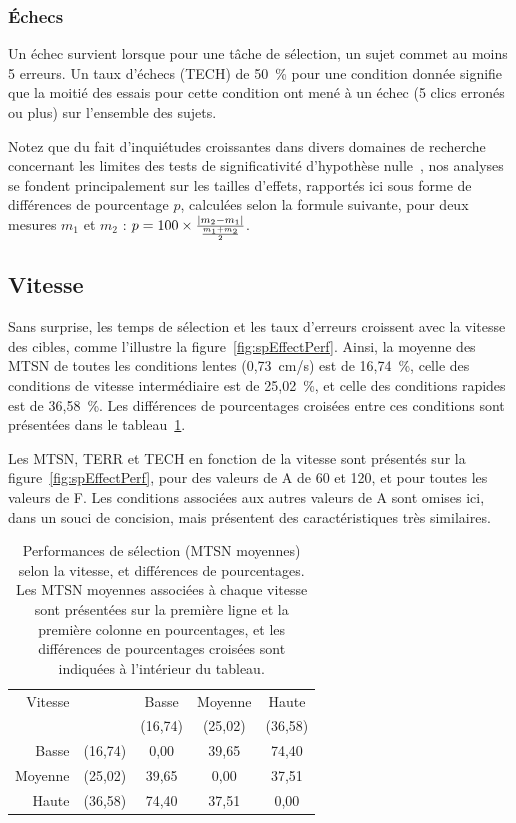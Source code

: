	\subsubsection{Échecs}
	Un échec survient lorsque pour une tâche de sélection, un sujet commet au moins 5 erreurs. 	Un taux d'échecs (TECH) de 50~\%{} pour une condition donnée signifie que la moitié des essais pour cette condition ont mené à un échec (5 clics erronés ou plus) sur l'ensemble des sujets.
	
	Notez que du fait d'inquiétudes croissantes dans divers domaines de recherche concernant les limites des tests de significativité d'hypothèse nulle~\cite{dragicevic2014running, cumming2014new}, nos analyses se fondent principalement sur les tailles d'effets, rapportés ici sous forme de différences de pourcentage $p$, calculées selon la formule suivante, pour deux mesures $m_{1}$ et $m_{2}$ : $p = 100 \times \frac{\abs*{m_{2} - m_{1}}}{\frac{m_{1} + m_{2}}{2}}$.

	\subsection{Vitesse}
	Sans surprise, les temps de sélection et les taux d'erreurs croissent avec la vitesse des cibles, comme l'illustre la figure~\ref{fig:spEffectPerf}. Ainsi, la moyenne des MTSN de toutes les conditions lentes (0,73~cm/s) est de 16,74~\%{}, celle des conditions de vitesse intermédiaire est de 25,02~\%{}, et celle des conditions rapides est de 36,58~\%{}. Les différences de pourcentages croisées entre ces conditions sont présentées dans le tableau~\ref{tab:spPerf}.

	Les MTSN, TERR et TECH en fonction de la vitesse sont présentés sur la figure~\ref{fig:spEffectPerf}, pour des valeurs de A de 60 et 120, et pour toutes les valeurs de F. Les conditions associées aux autres valeurs de A sont omises ici, dans un souci de concision, mais présentent des caractéristiques très similaires.
	
	\begin{table}
		\centering
		\begin{tabular}{r c | c c c}
			Vitesse			&			& Basse		& Moyenne	& Haute		\bigstrut[b] \\
							&			& (16,74)	& (25,02)	& (36,58)	\bigstrut[b] \\ \hline
			Basse			& (16,74)	& 0,00		& 39,65		& 74,40		\bigstrut[t] \\
			Moyenne			& (25,02)	& 39,65		& 0,00		& 37,51		\\
			Haute			& (36,58)	& 74,40		& 37,51		& 0,00		\\
		\end{tabular}
		\caption[Performances selon la vitesse]{Performances de sélection (MTSN moyennes) selon la vitesse, et différences de pourcentages. Les MTSN moyennes associées à chaque vitesse sont présentées sur la première ligne et la première colonne en pourcentages, et les différences de pourcentages croisées sont indiquées à l'intérieur du tableau.}
		\label{tab:spPerf}
	\end{table}
	
